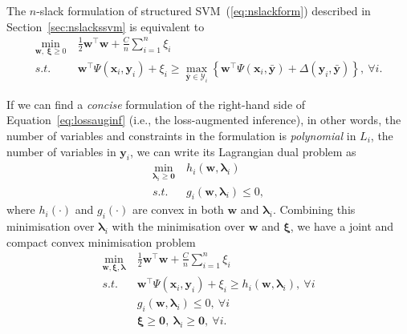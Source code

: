 
The $n$-slack formulation of structured SVM~(\ref{eq:nslackform}) described in Section~\ref{sec:nslackssvm} is equivalent to
\begin{align}
\min_{\mathbf{w}, ~\bm{\xi} \ge 0} ~& \frac{1}{2} \mathbf{w}^\top \mathbf{w} + \frac{C}{n} \sum_{i=1}^n \xi_i \\
s.t.~~ ~& \mathbf{w}^\top \Psi(\mathbf{x}_i, \mathbf{y}_i) + \xi_i \ge
          \max_{\bar{\mathbf{y}} \in \mathcal{Y}_i} 
          \left\{\mathbf{w}^\top \Psi(\mathbf{x}_i, \bar{\mathbf{y}}) + \Delta(\mathbf{y}_i, \bar{\mathbf{y}}) \right\},~\forall i. \label{eq:lossauginf}
\end{align}

If we can find a \emph{concise} formulation of the right-hand side of Equation~\ref{eq:lossauginf} (i.e., the loss-augmented inference),
in other words, the number of variables and constraints in the formulation is \emph{polynomial} in $L_i$, the number of variables in $\mathbf{y}_i$,
we can write its Lagrangian dual problem as 
\begin{align*}
\min_{\bm{\lambda}_i \ge \mathbf{0}} ~& h_i(\mathbf{w}, \bm{\lambda}_i) \\
s.t.~~ ~& g_i(\mathbf{w}, \bm{\lambda}_i) \le 0,
\end{align*}
where $h_i(\cdot)$ and $g_i(\cdot)$ are convex in both $\mathbf{w}$ and $\bm{\lambda}_i$.
Combining this minimisation over $\bm{\lambda}_i$ with the minimisation over $\mathbf{w}$ and $\bm{\xi}$,
we have a joint and compact convex minimisation problem
\begin{equation}
\label{eq:dualinf}
\begin{aligned}
\min_{\mathbf{w}, \bm{\xi}, \bm{\lambda}} ~& \frac{1}{2} \mathbf{w}^\top \mathbf{w} + \frac{C}{n} \sum_{i=1}^n \xi_i \\
s.t.~~ ~& \mathbf{w}^\top \Psi(\mathbf{x}_i, \mathbf{y}_i) + \xi_i \ge h_i(\mathbf{w}, \bm{\lambda}_i), ~\forall i \\
        & g_i(\mathbf{w}, \bm{\lambda}_i) \le 0, ~\forall i \\
        & \bm{\xi} \ge \mathbf{0}, ~\bm{\lambda}_i \ge \mathbf{0}, ~\forall i.
\end{aligned}
\end{equation}

